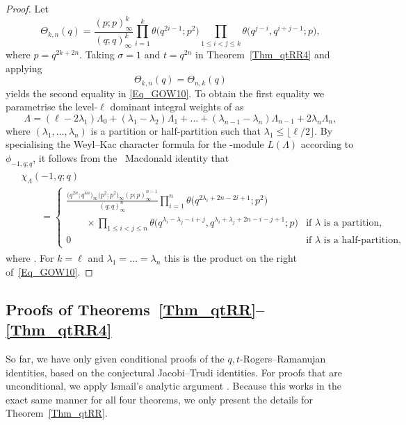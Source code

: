 \documentclass[pdftex]{sigma}
\numberwithin{equation}{section}
\renewcommand{\leq}{\leqslant}
\newcommand{\floor}[1]{\lfloor#1\rfloor}
\newcommand{\la}{\lambda}
\newcommand{\La}{\Lambda}
\begin{document}
\begin{proof}
Let
\[
\Theta_{k,n}(q)=\frac{(p;p)_{\infty}^k}{(q;q)_{\infty}^k}
\prod_{i=1}^k \theta\bigl(q^{2i-1};p^2\bigr)
\prod_{1\leq i<j\leq k}\theta\bigl(q^{j-i},q^{i+j-1};p\bigr),
\]
where $p=q^{2k+2n}$.
Taking $\sigma=1$ and $t=q^{2n}$ in Theorem~\ref{Thm_qtRR4} and applying
\[
\Theta_{k,n}(q)=\Theta_{n,k}(q)
\]
yields the second equality in \eqref{Eq_GOW10}.
To obtain the first equality we parametrise the level-$\ell$
dominant integral weights of  as
\[
\La=(\ell-2\la_1)\La_0+(\la_1-\la_2)\La_1+\dots+
(\la_{n-1}-\la_n)\La_{n-1}+2\la_n\La_n,
\]
where $(\la_1,\dots,\la_n)$ is a partition or half-partition
such that $\la_1\leq\floor{\ell/2}$.
By specialising the Weyl--Kac character formula
for the -module $L(\La)$ according to
$\phi_{-1,q;q}$, it follows from the~ Macdonald identity that
\begin{align*}
\begin{split}
&\chi_{\La}(-1,q;q) \\
&\qquad{}=\begin{cases}\displaystyle
\frac{\bigl(q^{2n};q^{4n}\bigr)_{\infty}\bigl(p^2;p^2\bigr)_{\infty}
(p;p)_{\infty}^{n-1}}{(q;q)_{\infty}^n}
\prod_{i=1}^n \theta\bigl(q^{2\la_i+2n-2i+1};p^2\bigr) & \\[4mm]
\displaystyle \qquad\times
\prod_{1\leq i<j\leq n}
\theta\bigl(q^{\la_i-\la_j-i+j},q^{\la_i+\la_j+2n-i-j+1};p\bigr)
&\text{if $\la$ is a partition}, \\[3mm]
0 &\text{if $\la$ is a half-partition},
\end{cases}
\end{split}
\end{align*}
where .
For $k=\ell$ and $\la_1=\dots=\la_n$ this is the product on the
right of~\eqref{Eq_GOW10}.
\end{proof}

\subsection{Proofs of Theorems~\ref{Thm_qtRR}--\ref{Thm_qtRR4}}
\label{Sec_Ismail}

So far, we have only given conditional proofs of the
$q,t$-Rogers--Ramanujan identities, based on the conjectural
Jacobi--Trudi identities.
For proofs that are unconditional, we apply Ismail's analytic
argument \cite{Ismail77}.
Because this works in the exact same manner for all four theorems,
we only present the details for Theorem~\ref{Thm_qtRR}.
\end{document}
